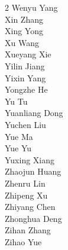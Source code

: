 \begin{multicols}{2}
Wenyu Yang \\
Xin Zhang \\
Xing Yong \\
Xu Wang \\
Xueyang Xie \\
Yilin Jiang   \\
Yixin Yang   \\
Yongzhe He   \\
Yu Tu \\
Yuanliang Dong \\
Yuchen Liu \\
Yue Ma   \\
Yue Yu \\
Yuxing Xiang \\
Zhaojun Huang   \\
Zhenru Lin \\
Zhipeng Xu   \\
Zhiyang Chen \\
Zhonghua Deng \\
Zihan Zhang \\
Zihao Yue \\


\end{multicols} %

\newpage